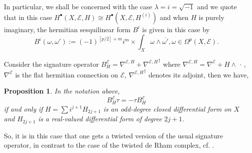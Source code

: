 \documentclass[12pt]{amsart}
\theoremstyle{plain}
\newtheorem{proposition}[theorem]{Proposition}
\theoremstyle{definition}
\theoremstyle{remark}
\begin{document}
In particular, 
we shall be concerned with the case $\lambda = i=\sqrt{-1}$  and we quote that in this case $H^\bullet(X,{\mathcal E},H)\cong H^\bullet(X,{\mathcal E},H^{(i)})$ and when $H$ is purely imaginary, 
the hermitian sesquilinear form $B^i$ is given 
in this case by
$$
B^i (\omega, \omega'):= (-1)^{[p/2]+m} i^m \times  \int_X \omega \wedge {\overline{\omega'}}, \omega \in \Omega^p (X, {\mathcal E}).
$$

{{
Consider the signature operator $B^{\mathcal E}_H = \nabla^{{\mathcal E}, H} + {\nabla^{{\mathcal E}, H}}^\dagger$ 
where $\nabla^{{\mathcal E}, H}=\nabla^{\mathcal E}+H\wedge\,\cdot\,$, 
$\nabla^{\mathcal E}$ is the  flat hermitian connection on ${\mathcal E}$, 
$ {\nabla^{{\mathcal E}, H}}^\dagger$ denotes its adjoint, 
then we have,}}

\begin{proposition}
In the notation above,
$$
B^{\mathcal E}_H \tau = - \tau B^{\mathcal E}_H
$$
if and only if $H = \sum i^{j+1} H_{2j+1} $ is an 
odd-degree closed differential form on $X$ and $H_{2j+1}$ is a real-valued differential form 
of degree ${2j+1}$. 
\end{proposition}

So, it is  in this case that one gets {{a twisted version of the usual}} signature operator, in contrast to the 
case of the twisted de Rham complex, cf. \cite{BCMMS,AS,MW,MW2}. 
\end{document}
